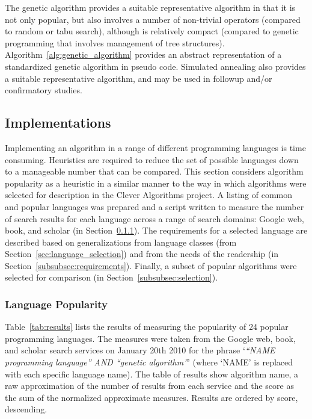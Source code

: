 \documentclass[a4paper, 11pt]{article}
\begin{document}
The genetic algorithm provides a suitable representative algorithm in that it is not only popular, but also involves a number of non-trivial operators (compared to random or tabu search), although is relatively compact (compared to genetic programming that involves management of tree structures). Algorithm~\ref{alg:genetic_algorithm} provides an abstract representation of a standardized genetic algorithm in pseudo code. Simulated annealing also provides a suitable representative algorithm, and may be used in followup and/or confirmatory studies. 


% 
% 
\subsection{Implementations}
Implementing an algorithm in a range of different programming languages is time consuming. Heuristics are required to reduce the set of possible languages down to a manageable number that can be compared.
This section considers algorithm popularity as a heuristic in a similar manner to the way in which algorithms were selected for description in the Clever Algorithms project. A listing of common and popular languages was prepared and a script written to measure the number of search results for each language across a range of search domains: Google web, book, and scholar (in Section~\ref{subsubsec:popularity}). The requirements for a selected language are described based on generalizations from language classes (from Section~\ref{sec:language_selection}) and from the needs of the readership (in Section~\ref{subsubsec:requirements}). Finally, a subset of popular algorithms were selected for comparison (in Section~\ref{subsubsec:selection}).

% 
% 
\subsubsection{Language Popularity}
\label{subsubsec:popularity}
Table~\ref{tab:results} lists the results of measuring the popularity of 24 popular programming languages. 
The measures were taken from the Google web, book, and scholar search services on January 20th 2010 for the phrase `\emph{``NAME programming language'' AND ``genetic algorithm''}' (where `NAME' is replaced with each specific language name). The table of results show algorithm name, a raw approximation of the number of results from each service and the score as the sum of the normalized approximate measures. Results are ordered by score, descending.
\end{document}
